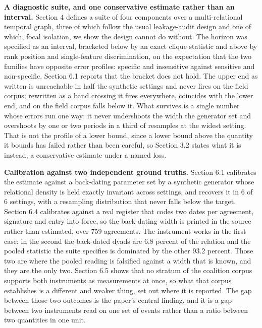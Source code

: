 \documentclass[twoside,11pt]{article}
\begin{document}
\textbf{A diagnostic suite, and one conservative estimate rather than an interval.} Section 4 defines a suite of four components over a multi-relational temporal graph, three of which follow the usual leakage-audit design and one of which, focal isolation, we show the design cannot do without. The horizon was specified as an interval, bracketed below by an exact clique statistic and above by rank position and single-feature discrimination, on the expectation that the two families have opposite error profiles: specific and insensitive against sensitive and non-specific. Section 6.1 reports that the bracket does not hold. The upper end as written is unreachable in half the synthetic settings and never fires on the field corpus; rewritten as a band crossing it fires everywhere, coincides with the lower end, and on the field corpus falls below it. What survives is a single number whose errors run one way: it never undershoots the width the generator set and overshoots by one or two periods in a third of resamples at the widest setting. That is not the profile of a lower bound, since a lower bound above the quantity it bounds has failed rather than been careful, so Section 3.2 states what it is instead, a conservative estimate under a named loss.

\textbf{Calibration against two independent ground truths.} Section 6.1 calibrates the estimate against a back-dating parameter set by a synthetic generator whose relational density is held exactly invariant across settings, and recovers it in 6 of 6 settings, with a resampling distribution that never falls below the target. Section 6.4 calibrates against a real register that codes two dates per agreement, signature and entry into force, so the back-dating width is printed in the source rather than estimated, over 759 agreements. The instrument works in the first case; in the second the back-dated dyads are 6.8 percent of the relation and the pooled statistic the suite specifies is dominated by the other 93.2 percent. Those two are where the pooled reading is falsified against a width that is known, and they are the only two. Section 6.5 shows that no stratum of the coalition corpus supports both instruments as measurements at once, so what that corpus establishes is a different and weaker thing, set out where it is reported. The gap between those two outcomes is the paper's central finding, and it is a gap between two instruments read on one set of events rather than a ratio between two quantities in one unit.
\end{document}

